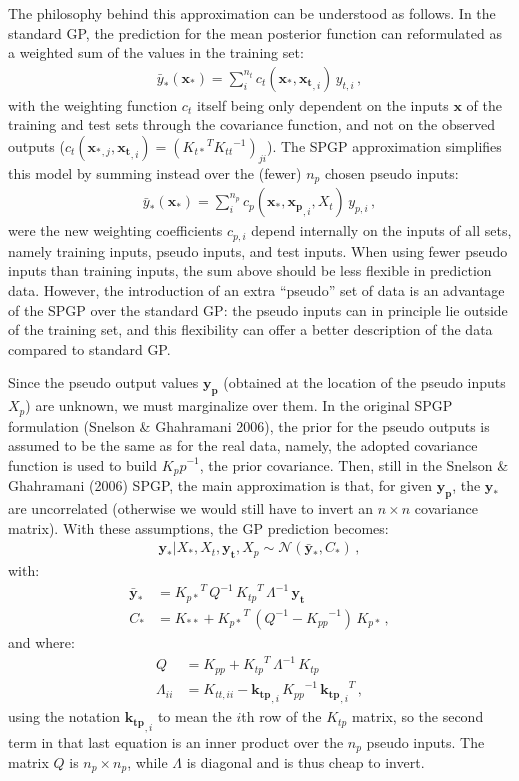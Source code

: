 \documentclass[11pt,a4paper]{article}
\numberwithin{equation}{section}
\begin{document}
The philosophy behind this approximation can be understood as follows. In the standard GP, the prediction for the mean posterior function can reformulated as a weighted sum of the values in the training set:
\begin{align}
\bar{y}_*(\mathbf{x_*}) = \sum_i^{n_t} c_{t}(\mathbf{x_*}, \mathbf{x_t}_{,i})\,y_{t,i}\,,
\end{align}
with the weighting function $c_{t}$ itself being only dependent on the inputs $\mathbf{x}$ of the training and test sets through the covariance function, and not on the observed outputs ($c_{t}(\mathbf{x_*}_{,j}, \mathbf{x_t}_{,i}) = ({K_{t*}}^T {K_{tt}}^{-1})_{ji}$). The SPGP approximation simplifies this model by summing instead over the (fewer) $n_p$ chosen pseudo inputs:
\begin{align}
\bar{y}_*(\mathbf{x_*}) = \sum_i^{n_p} c_{p}(\mathbf{x_*}, \mathbf{x_p}_{,i}, X_t)\,y_{p,i}\,,
\end{align}
were the new weighting coefficients $c_{p,i}$ depend internally on the inputs of all sets, namely training inputs, pseudo inputs, and test inputs. When using fewer pseudo inputs than training inputs, the sum above should be less flexible in prediction data. However, the introduction of an extra ``pseudo'' set of data is an advantage of the SPGP over the standard GP: the pseudo inputs can in principle lie outside of the training set, and this flexibility can offer a better description of the data compared to standard GP.

Since the pseudo output values $\mathbf{y_p}$ (obtained at the location of the pseudo inputs $X_p$) are unknown, we must marginalize over them. In the original SPGP formulation (Snelson \& Ghahramani 2006), the prior for the pseudo outputs is assumed to be the same as for the real data, namely, the adopted covariance function is used to build ${K_pp}^{-1}$, the prior covariance. Then, still in the Snelson \& Ghahramani (2006) SPGP, the main approximation is that, for given $\mathbf{y_p}$, the $\mathbf{y_*}$ are uncorrelated (otherwise we would still have to invert an $n \times n$ covariance matrix). With these assumptions, the GP prediction becomes:
\begin{align}
\mathbf{y_*} | X_*, X_t, \mathbf{y_t}, X_p \sim \mathcal{N}(\mathbf{\bar{y}_*}, C_*)\,,
\end{align}
with:
\begin{align}
\mathbf{\bar{y}_*} &= {K_{p*}}^T\,Q^{-1}\,{K_{tp}}^T\,\Lambda^{-1}\,\mathbf{y_t}\, \label{EQ:spgp_pred_mean} \\
C_* &= K_{**} + {K_{p*}}^T\,(Q^{-1} - {K_{pp}}^{-1})\,K_{p*}\,,
\end{align}
and where:
\begin{align}
Q &= K_{pp} + {K_{tp}}^T\,\Lambda^{-1}\,K_{tp}\, \\
\Lambda_{ii} &= K_{tt,ii} - \mathbf{k_{tp}}_{,i}\,{K_{pp}}^{-1}\,{\mathbf{k_{tp}}_{,i}}^T \,,
\end{align}
using the notation $\mathbf{k_{tp}}_{,i}$ to mean the $i$th row of the $K_{tp}$ matrix, so the second term in that last equation is an inner product over the $n_p$ pseudo inputs. The matrix $Q$ is $n_p \times n_p$, while $\Lambda$ is diagonal and is thus cheap to invert.
\end{document}
